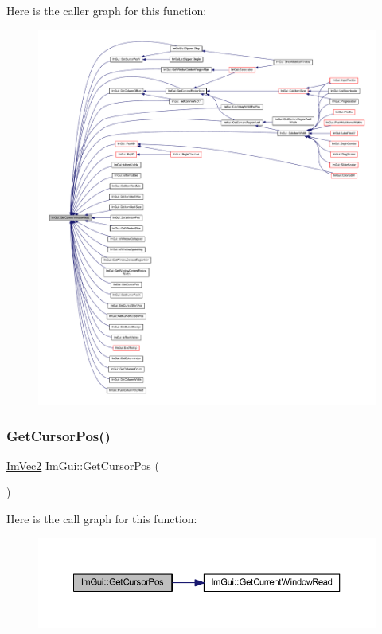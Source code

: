 Here is the caller graph for this function\+:
\nopagebreak
\begin{figure}[H]
\begin{center}
\leavevmode
\includegraphics[width=350pt]{namespace_im_gui_a408f9ddac92f8629a7e273ced5f8c3aa_icgraph}
\end{center}
\end{figure}
\mbox{\label{namespace_im_gui_a2fa4eb57e0f73b90e8edcd226a0cc7d5}} 
\subsubsection{\texorpdfstring{Get\+Cursor\+Pos()}{GetCursorPos()}}
{\footnotesize\ttfamily \mbox{\hyperlink{struct_im_vec2}{Im\+Vec2}} Im\+Gui\+::\+Get\+Cursor\+Pos (\begin{DoxyParamCaption}{ }\end{DoxyParamCaption})}

Here is the call graph for this function\+:
\nopagebreak
\begin{figure}[H]
\begin{center}
\leavevmode
\includegraphics[width=350pt]{namespace_im_gui_a2fa4eb57e0f73b90e8edcd226a0cc7d5_cgraph}
\end{center}
\end{figure}
\mbox{\label{namespace_im_gui_a022e32c808ac899e25847f4d65633b77}} 
